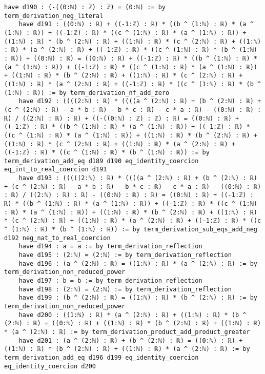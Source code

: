 \documentclass{article}
\begin{document}
\begin{tcolorbox}[colback=white!10, width=\linewidth]
\begin{lstlisting}[language=Lean4]
    have d190 : (-((0:ℕ) : ℤ) : ℤ) = (0:ℕ) := by term_derivation_neg_literal
    have d191 : ((0:ℕ) : ℝ) + ((-1:ℤ) : ℝ) * ((b ^ (1:ℕ) : ℝ) * (a ^ (1:ℕ) : ℝ)) + ((-1:ℤ) : ℝ) * ((c ^ (1:ℕ) : ℝ) * (a ^ (1:ℕ) : ℝ)) + ((1:ℕ) : ℝ) * (b ^ (2:ℕ) : ℝ) + ((1:ℕ) : ℝ) * (c ^ (2:ℕ) : ℝ) + ((1:ℕ) : ℝ) * (a ^ (2:ℕ) : ℝ) + ((-1:ℤ) : ℝ) * ((c ^ (1:ℕ) : ℝ) * (b ^ (1:ℕ) : ℝ)) + ((0:ℕ) : ℝ) = ((0:ℕ) : ℝ) + ((-1:ℤ) : ℝ) * ((b ^ (1:ℕ) : ℝ) * (a ^ (1:ℕ) : ℝ)) + ((-1:ℤ) : ℝ) * ((c ^ (1:ℕ) : ℝ) * (a ^ (1:ℕ) : ℝ)) + ((1:ℕ) : ℝ) * (b ^ (2:ℕ) : ℝ) + ((1:ℕ) : ℝ) * (c ^ (2:ℕ) : ℝ) + ((1:ℕ) : ℝ) * (a ^ (2:ℕ) : ℝ) + ((-1:ℤ) : ℝ) * ((c ^ (1:ℕ) : ℝ) * (b ^ (1:ℕ) : ℝ)) := by term_derivation_nf_add_zero
    have d192 : ((((2:ℕ) : ℝ) * ((((a ^ (2:ℕ) : ℝ) + (b ^ (2:ℕ) : ℝ) + (c ^ (2:ℕ) : ℝ) - a * b : ℝ) - b * c : ℝ) - c * a : ℝ) - ((0:ℕ) : ℝ) : ℝ) / ((2:ℕ) : ℝ) : ℝ) + ((-((0:ℕ) : ℤ) : ℤ) : ℝ) = ((0:ℕ) : ℝ) + ((-1:ℤ) : ℝ) * ((b ^ (1:ℕ) : ℝ) * (a ^ (1:ℕ) : ℝ)) + ((-1:ℤ) : ℝ) * ((c ^ (1:ℕ) : ℝ) * (a ^ (1:ℕ) : ℝ)) + ((1:ℕ) : ℝ) * (b ^ (2:ℕ) : ℝ) + ((1:ℕ) : ℝ) * (c ^ (2:ℕ) : ℝ) + ((1:ℕ) : ℝ) * (a ^ (2:ℕ) : ℝ) + ((-1:ℤ) : ℝ) * ((c ^ (1:ℕ) : ℝ) * (b ^ (1:ℕ) : ℝ)) := by term_derivation_add_eq d189 d190 eq_identity_coercion eq_int_to_real_coercion d191
    have d193 : (((((2:ℕ) : ℝ) * ((((a ^ (2:ℕ) : ℝ) + (b ^ (2:ℕ) : ℝ) + (c ^ (2:ℕ) : ℝ) - a * b : ℝ) - b * c : ℝ) - c * a : ℝ) - ((0:ℕ) : ℝ) : ℝ) / ((2:ℕ) : ℝ) : ℝ) - ((0:ℕ) : ℝ) : ℝ) = ((0:ℕ) : ℝ) + ((-1:ℤ) : ℝ) * ((b ^ (1:ℕ) : ℝ) * (a ^ (1:ℕ) : ℝ)) + ((-1:ℤ) : ℝ) * ((c ^ (1:ℕ) : ℝ) * (a ^ (1:ℕ) : ℝ)) + ((1:ℕ) : ℝ) * (b ^ (2:ℕ) : ℝ) + ((1:ℕ) : ℝ) * (c ^ (2:ℕ) : ℝ) + ((1:ℕ) : ℝ) * (a ^ (2:ℕ) : ℝ) + ((-1:ℤ) : ℝ) * ((c ^ (1:ℕ) : ℝ) * (b ^ (1:ℕ) : ℝ)) := by term_derivation_sub_eqs_add_neg d192 neg_nat_to_real_coercion
    have d194 : a = a := by term_derivation_reflection
    have d195 : (2:ℕ) = (2:ℕ) := by term_derivation_reflection
    have d196 : (a ^ (2:ℕ) : ℝ) = ((1:ℕ) : ℝ) * (a ^ (2:ℕ) : ℝ) := by term_derivation_non_reduced_power
    have d197 : b = b := by term_derivation_reflection
    have d198 : (2:ℕ) = (2:ℕ) := by term_derivation_reflection
    have d199 : (b ^ (2:ℕ) : ℝ) = ((1:ℕ) : ℝ) * (b ^ (2:ℕ) : ℝ) := by term_derivation_non_reduced_power
    have d200 : ((1:ℕ) : ℝ) * (a ^ (2:ℕ) : ℝ) + ((1:ℕ) : ℝ) * (b ^ (2:ℕ) : ℝ) = ((0:ℕ) : ℝ) + ((1:ℕ) : ℝ) * (b ^ (2:ℕ) : ℝ) + ((1:ℕ) : ℝ) * (a ^ (2:ℕ) : ℝ) := by term_derivation_product_add_product_greater
    have d201 : (a ^ (2:ℕ) : ℝ) + (b ^ (2:ℕ) : ℝ) = ((0:ℕ) : ℝ) + ((1:ℕ) : ℝ) * (b ^ (2:ℕ) : ℝ) + ((1:ℕ) : ℝ) * (a ^ (2:ℕ) : ℝ) := by term_derivation_add_eq d196 d199 eq_identity_coercion eq_identity_coercion d200

\end{lstlisting}
\end{tcolorbox}
\end{document}
